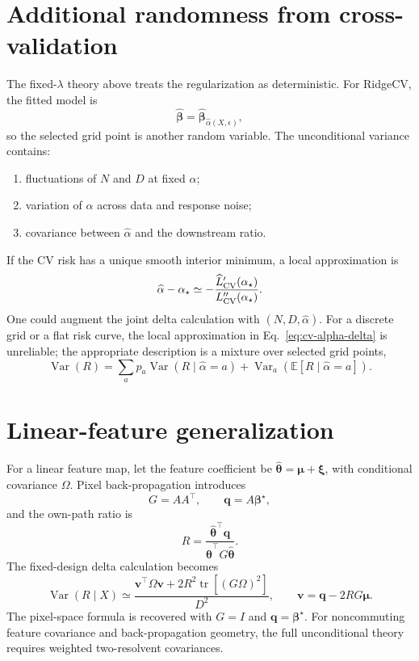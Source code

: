 \documentclass[11pt]{article}
\newcommand{\E}{\mathbb{E}}
\newcommand{\Var}{\operatorname{Var}}
\newcommand{\tr}{\operatorname{tr}}
\newcommand{\bhat}{\widehat{\bm\beta}}
\newcommand{\bstar}{\bm\beta^\star}
\begin{document}
\section{Additional randomness from cross-validation}

The fixed-\(\lambda\) theory above treats the regularization as deterministic.
For RidgeCV, the fitted model is
\begin{equation}
  \bhat=\bhat_{\widehat\alpha(X,\epsilon)},
\end{equation}
so the selected grid point is another random variable.  The unconditional
variance contains:
\begin{enumerate}
  \item fluctuations of \(N\) and \(D\) at fixed \(\alpha\);
  \item variation of \(\widehat\alpha\) across data and response noise;
  \item covariance between \(\widehat\alpha\) and the downstream ratio.
\end{enumerate}
If the CV risk has a unique smooth interior minimum, a local approximation is
\begin{equation}
  \widehat\alpha-\alpha_\star
  \simeq
  -\frac{\widehat L_{\rm CV}'(\alpha_\star)}
         {L_{\rm CV}''(\alpha_\star)}.
  \label{eq:cv-alpha-delta}
\end{equation}
One could augment the joint delta calculation with
\((N,D,\widehat\alpha)\).  For a discrete grid or a flat risk curve, the local
approximation in Eq.~\eqref{eq:cv-alpha-delta} is unreliable; the appropriate
description is a mixture over selected grid points,
\begin{equation}
  \Var(R)
  =
  \sum_a p_a\Var(R\mid\widehat\alpha=a)
  +
  \Var_a\!\left(\E[R\mid\widehat\alpha=a]\right).
\end{equation}

\section{Linear-feature generalization}

For a linear feature map, let the feature coefficient be
\(\widehat{\bm\theta}=\bm\mu+\bm\xi\), with conditional covariance \(\Omega\).
Pixel back-propagation introduces
\begin{equation}
  G=AA^\top,\qquad \bm q=A\bstar,
\end{equation}
and the own-path ratio is
\begin{equation}
  R=
  \frac{\widehat{\bm\theta}^\top\bm q}
       {\widehat{\bm\theta}^\top G\widehat{\bm\theta}}.
\end{equation}
The fixed-design delta calculation becomes
\begin{equation}
\boxed{
  \Var(R\mid X)
  \simeq
  \frac{
    \bm v^\top\Omega\bm v
    +2R^2\tr[(G\Omega)^2]
  }{D^2},
  \qquad
  \bm v=\bm q-2RG\bm\mu.
}
\label{eq:feature-varR}
\end{equation}
The pixel-space formula is recovered with \(G=I\) and \(\bm q=\bstar\).
For noncommuting feature covariance and back-propagation geometry, the full
unconditional theory requires weighted two-resolvent covariances.
\end{document}
